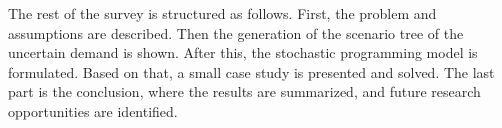 The rest of the survey is structured as follows. First, the problem and assumptions are described. Then the generation of the scenario tree of the uncertain demand is shown. After this, the stochastic programming model is formulated. Based on that, a small case study is presented and solved. The last part is the conclusion, where the results are summarized, and future research opportunities are identified.